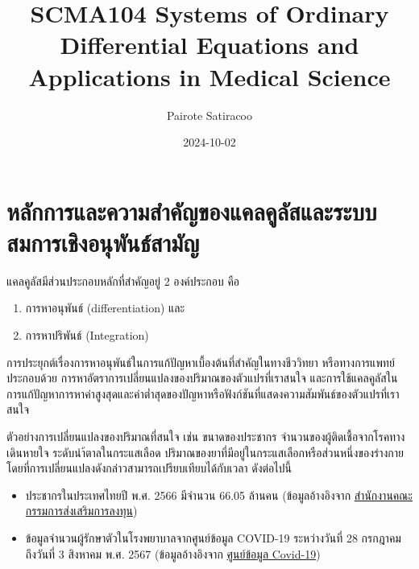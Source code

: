 \documentclass[
]{book}
\title{SCMA104 Systems of Ordinary Differential Equations and Applications in Medical Science}
\author{Pairote Satiracoo}
\date{2024-10-02}
\theoremstyle{definition}
\theoremstyle{definition}
\theoremstyle{definition}
\theoremstyle{definition}
\theoremstyle{remark}
\begin{document}
\maketitle

{
\setcounter{tocdepth}{1}
\tableofcontents
}
\chapter{หลักการและความสำคัญของแคลคูลัสและระบบสมการเชิงอนุพันธ์สามัญ}\label{uxe2buxe25uxe01uxe01uxe32uxe23uxe41uxe25uxe30uxe04uxe27uxe32uxe21uxe2auxe33uxe04uxe0duxe02uxe2duxe07uxe41uxe04uxe25uxe04uxe25uxe2auxe41uxe25uxe30uxe23uxe30uxe1auxe1auxe2auxe21uxe01uxe32uxe23uxe40uxe0auxe07uxe2duxe19uxe1euxe19uxe18uxe2auxe32uxe21uxe0d}

แคลคูลัสมีส่วนประกอบหลักที่สำคัญอยู่ 2 องค์ประกอบ คือ

\begin{enumerate}
\def\labelenumi{\arabic{enumi}.}
\item
  การหาอนุพันธ์ (differentiation) และ
\item
  การหาปริพันธ์ (Integration)
\end{enumerate}

การประยุกต์เรื่องการหาอนุพันธ์ในการแก้ปัญหาเบื้องต้นที่สำคัญในทางชีววิทยา หรือทางการแพทย์ ประกอบด้วย การหาอัตราการเปลี่ยนแปลงของปริมาณของตัวแปรที่เราสนใจ และการใช้แคลคูลัสในการแก้ปัญหาการหาค่าสูงสุดและค่าต่ำสุดของปัญหาหรือฟังก์ชันที่แสดงความสัมพันธ์ของตัวแปรที่เราสนใจ

ตัวอย่างการเปลี่ยนแปลงของปริมาณที่สนใจ เช่น ขนาดของประชากร จำนวนของผู้ติดเชื้อจากโรคทางเดินหายใจ ระดับนำ้ตาลในกระแสเลือด ปริมาณของยาที่มีอยู่ในกระแสเลือกหรือส่วนหนึ่งของร่างกาย โดยที่การเปลี่ยนแปลงดังกล่าวสามารถเปรียบเทียบได้กับเวลา ดังต่อไปนี้

\begin{itemize}
\item
  ประชากรในประเทศไทยปี พ.ศ. 2566 มีจำนวน 66.05 ล้านคน (ข้อมูลอ้างอิงจาก \href{https://www.boi.go.th/index.php?page=demographic}{สำนักงานคณะกรรมการส่งเสริมการลงทุน})
\item
  ข้อมูลจำนวนผู้รักษาตัวในโรงพยาบาลจากศูนย์ข้อมูล COVID-19 ระหว่างวันที่ 28 กรกฎาคม ถึงวันที่ 3 สิงหาคม พ.ศ. 2567 (ข้อมูลอ้างอิงจาก \href{https://www.facebook.com/informationcovid19?locale=th_TH}{ศูนย์ข้อมูล Covid-19})
\end{itemize}
\end{document}

